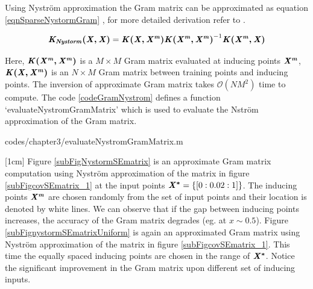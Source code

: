Using Nystr\"{o}m approximation the Gram matrix can be approximated as equation \ref{eqnSparseNystormGram} \cite{quinonero2005unifying, seeger2003fast}, for more detailed derivation refer to \cite{williams2001using}. 

\begin{equation}\label{eqnSparseNystormGram}
\bm{\mathit{K_{Nystorm}(X, X)}} = \bm{\mathit{K(X, X^{m})}} \bm{\mathit{K(X^{m}, X^{m})}}^{-1} \bm{\mathit{K(X^{m}, X)}}
\end{equation}

Here, $\bm{\mathit{K(X^{m}, X^{m})}}$ is a $M \times M$ Gram matrix evaluated at inducing points $\bm{\mathit{X^{m}}}$, $\bm{\mathit{K(X, X^{m})}}$ is an $N \times M$ Gram matrix between training points and inducing points. The inversion of approximate Gram matrix takes $\mathcal{O}\left ( NM^{2} \right )$ time to compute. The code \ref{codeGramNystrom} defines a function `evaluateNystromGramMatrix' which is used to evaluate the Nstr\"{o}m approximation of the Gram matrix. 

\begin{mdframed}[hidealllines=true,backgroundcolor=lightgray!20]

                    {codes/chapter3/evaluateNystromGramMatrix.m}
\end{mdframed}

[1cm]
Figure \ref{subFigNystormSEmatrix} is an approximate Gram matrix computation using Nystr\"{o}m approximation of the matrix in figure \ref{subFigcovSEmatrix_1} at the input points $\bm{\mathit{X^{*}}} = \{[0:0.02:1]\}$. The inducing points $\bm{\mathit{X^{m}}}$ are chosen randomly from the set of input points and their location is denoted by white lines. We can observe that if the gap between inducing points increases, the accuracy of the Gram matrix degrades (eg. at $x \sim 0.5$). Figure \ref{subFignystormSEmatrixUniform} is again an approximated Gram matrix using Nystr\"{o}m approximation of the matrix in figure \ref{subFigcovSEmatrix_1}. This time the equally spaced inducing points are chosen in the range of $\bm{\mathit{X^{*}}}$. Notice the significant improvement in the Gram matrix upon different set of inducing inputs.

